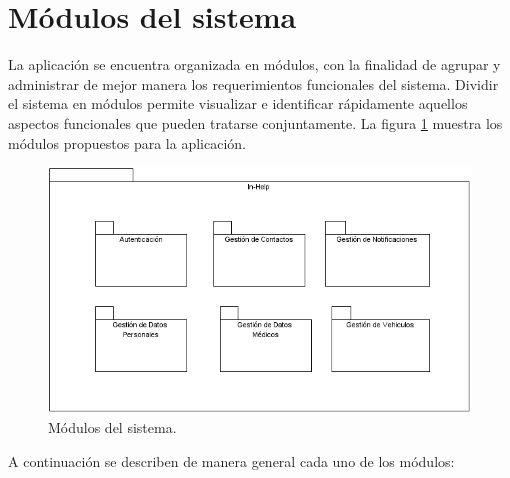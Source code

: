 
\section{Módulos del sistema}

La aplicación se encuentra organizada en módulos, con la finalidad de agrupar y administrar de mejor manera los requerimientos funcionales del sistema. Dividir el sistema en módulos permite visualizar e identificar rápidamente aquellos aspectos funcionales que pueden tratarse conjuntamente. La figura \ref{fig:modulos} muestra los módulos propuestos para la aplicación.

\begin{figure}[h!]
	\begin{center}
		\includegraphics[scale=0.4]{ModeloComportamiento/imagenes/modulosSistema.png}
		\caption{Módulos del sistema.}
		\label{fig:modulos}
	\end{center}
\end{figure}

A continuación se describen de manera general cada uno de los módulos:

